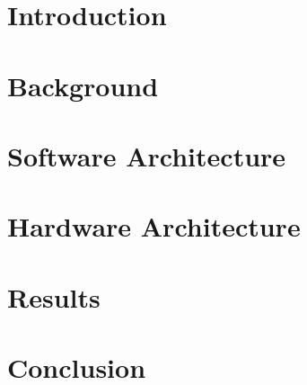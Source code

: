 \documentclass[10pt]{esda}
\begin{document}
\cleardoublepage


\cleardoublepage
\section{Introduction}
\label{sec:intro}


\cleardoublepage
\section{Background}
\label{sec:back}


\cleardoublepage
\section{Software Architecture}
\label{sec:sw}


\cleardoublepage
\section{Hardware Architecture}
\label{sec:hw}


\cleardoublepage
\section{Results}
\label{sec:results}


\cleardoublepage
\section{Conclusion}
\label{sec:conc}


\cleardoublepage
{}


\end{document}
